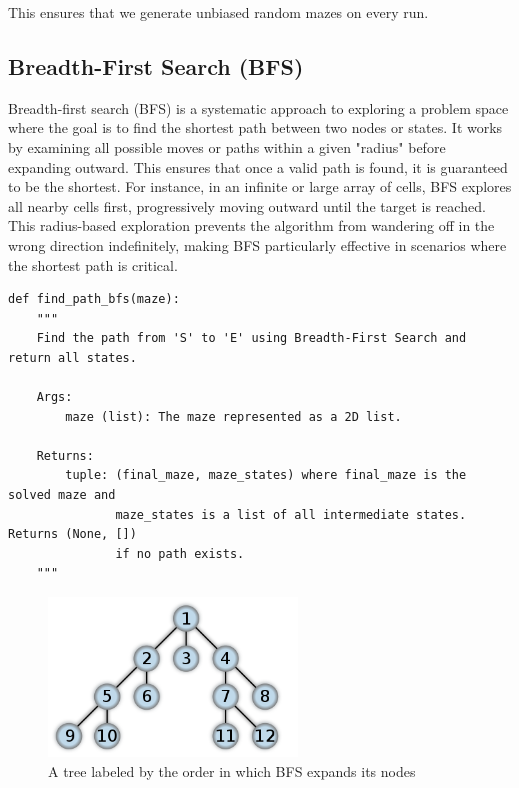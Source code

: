\documentclass[final, journal, 11pt]{report}
\begin{document}
	This ensures that we generate unbiased random mazes on every run.
	
	
	\subsection*{Breadth-First Search (BFS)}
	
	Breadth-first search (BFS) is a systematic approach to exploring a problem space where the goal is to find the shortest path between two nodes or states. It works by examining all possible moves or paths within a given "radius" before expanding outward. This ensures that once a valid path is found, it is guaranteed to be the shortest. For instance, in an infinite or large array of cells, BFS explores all nearby cells first, progressively moving outward until the target is reached. This radius-based exploration prevents the algorithm from wandering off in the wrong direction indefinitely, making BFS particularly effective in scenarios where the shortest path is critical.
	

	
	\begin{lstlisting}
def find_path_bfs(maze):
    """
    Find the path from 'S' to 'E' using Breadth-First Search and return all states.

    Args:
        maze (list): The maze represented as a 2D list.

    Returns:
        tuple: (final_maze, maze_states) where final_maze is the solved maze and 
               maze_states is a list of all intermediate states. Returns (None, [])
               if no path exists.
    """
	\end{lstlisting}
	
		\begin{figure}[!htbp]
			\centering
			\includegraphics[width=2.6in]{assets/BFS.png}
			\caption{A tree labeled by the order in which BFS expands its nodes}
			\label{fig:BFS}
		\end{figure} 
		
	
	
\end{document}
